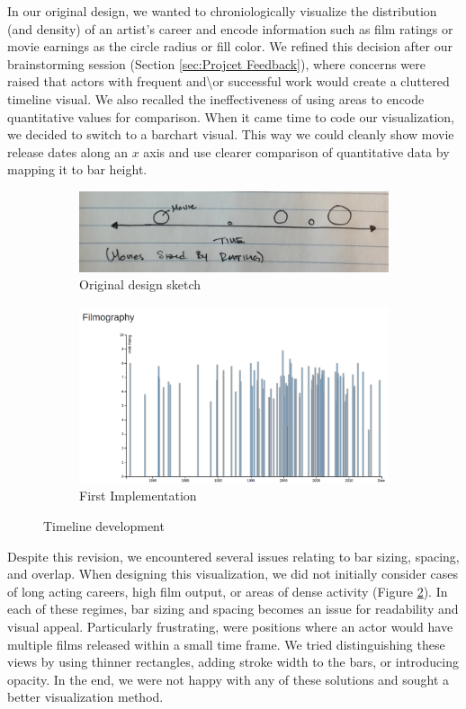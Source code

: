 \documentclass[12pt]{article}
\begin{document}
In our original design, we wanted to chroniologically visualize the distribution (and density) of an artist's career and encode information such as film ratings or movie earnings as the circle radius or fill color.   We refined this decision after our brainstorming session (Section \ref{sec:Projcet Feedback}), where concerns were raised that actors with frequent and\textbackslash or successful work would create a cluttered timeline visual.  We also recalled the ineffectiveness of using areas to encode quantitative values for comparison.  When it came time to code our visualization, we decided to switch to a barchart visual.  This way we could cleanly show movie release dates along an $x$ axis and use clearer comparison of quantitative data by mapping it to bar height.

	\begin{figure}[h!]
			\centering
			\begin{subfigure}[t]{.5\textwidth}
			  \centering
			  \includegraphics[width=\linewidth]{images/timeline_orig.png}
			  \caption{Original design sketch}
			  \label{fig:timelineA}
			\end{subfigure}%
			\begin{subfigure}[t]{.5\textwidth}
			  \centering
			  \includegraphics[width=.7\linewidth]{images/timeline_crop_waits.png}
			  \caption{First Implementation}
			  \label{fig:timelineB}
			\end{subfigure}%
			\caption{Timeline development}
			\label{fig:timeline}
		\end{figure}
		
		
Despite this revision, we encountered several issues relating to bar sizing, spacing, and overlap.  When designing this visualization, we did not initially consider cases of long acting careers, high film output, or areas of dense activity (Figure \ref{fig:timelineB}). In each of these regimes, bar sizing and spacing becomes an issue for readability and visual appeal.  Particularly frustrating, were positions where an actor would have multiple films released within a small time frame.  We tried distinguishing these views by using thinner rectangles, adding stroke width to the bars, or introducing opacity.  In the end, we were not happy with any of these solutions and sought a better visualization method.
\end{document}
